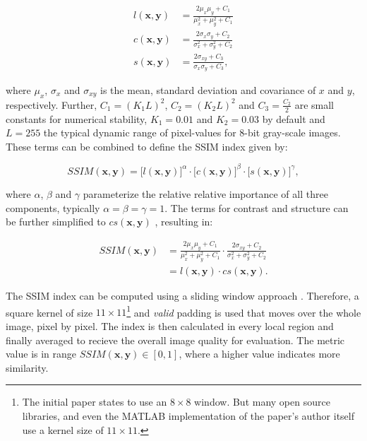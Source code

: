\begin{equation} \label{eq:ssim-components}
\begin{aligned}
l(\textbf{x}, \textbf{y}) &= \frac{2 \mu_x \mu_y + C_1}{\mu_x^2 + \mu_y^2 + C_1} \\
c(\textbf{x}, \textbf{y}) &= \frac{2 \sigma_x \sigma_y + C_2}{\sigma_x^2 + \sigma_y^2 + C_2} \\
s(\textbf{x}, \textbf{y}) &= \frac{2 \sigma_{xy} + C_3}{\sigma_x \sigma_y + C_3} ,
\end{aligned}
\end{equation}

where $ \mu_x $, $ \sigma_x $ and $ \sigma_{xy} $ is the mean, standard deviation and covariance of $ x $ and $ y $, respectively. Further, $ C_1 = (K_1 L)^2 $, $ C_2 = (K_2 L)^2 $ and $ C_3 = \frac{C_2}{2} $ are small constants for numerical stability, $K_1 = 0.01$ and $ K_2 = 0.03 $ by default and $ L=255 $ the typical dynamic range of pixel-values for 8-bit gray-scale images. These terms can be combined to define the SSIM index given by:

\begin{equation} \label{eq:ssim-combined}
SSIM(\textbf{x}, \textbf{y}) = \big[ l(\textbf{x}, \textbf{y})\big]^{\alpha} \cdot \big[c(\textbf{x}, \textbf{y}) \big]^{\beta} \cdot \big[ s(\textbf{x}, \textbf{y}) \big]^{\gamma} ,
\end{equation}

where $ \alpha $, $ \beta $ and $ \gamma $ parameterize the relative relative importance of all three components, typically $ \alpha = \beta = \gamma = 1 $. The terms for contrast and structure can be further simplified to $ cs(\textbf{x}, \textbf{y}) $ \parencite[p. 5]{loss-func-img-proc}, resulting in:

\begin{equation} \label{eq:ssim-simplified}
\begin{aligned}
SSIM(\textbf{x}, \textbf{y}) &= \frac{2 \mu_x \mu_y + C_1}{\mu_x^2 + \mu_y^2 + C_1} \cdot \frac{2 \sigma_{xy} + C_2}{\sigma_x^2 + \sigma_y^2 + C_2} \\
&= l(\textbf{x}, \textbf{y}) \cdot cs(\textbf{x}, \textbf{y}) .
\end{aligned}
\end{equation}

The SSIM index can be computed using a sliding window approach \parencite{ssim-slide}. Therefore, a square kernel of size $ 11 \times 11 $\footnote{The initial paper states to use an $ 8 \times 8 $ window. But many open source libraries, and even the MATLAB implementation of the paper's author itself use a kernel size of $ 11 \times 11 $.} and \textit{valid} padding is used that moves over the whole image, pixel by pixel. The index is then calculated in every local region and finally averaged to recieve the overall image quality for evaluation. The metric value is in range $ SSIM(\textbf{x}, \textbf{y}) \in [0, 1] $, where a higher value indicates more similarity.

